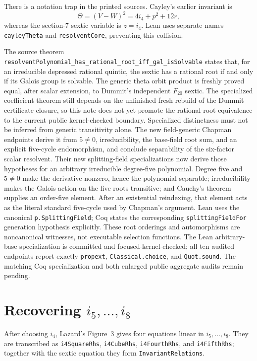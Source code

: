 \documentclass[11pt,a4paper,oneside]{article}
\newcommand{\lean}[1]{\nolinkurl{#1}}
\newcommand{\ii}[1]{i_{#1}}
\begin{document}
There is a notation trap in the printed sources.  Cayley's earlier invariant is
\[
 \Theta=(V-W)^2=4\ii4+p^2+12r,
\]
whereas the section-7 sextic variable is $z=\ii4$.  Lean uses separate names
\lean{cayleyTheta} and \lean{resolventCore}, preventing this collision.

The source theorem
\lean{resolventPolynomial_has_rational_root_iff_gal_isSolvable} states that,
for an irreducible depressed rational quintic, the sextic has a rational root
if and only if its Galois group is solvable.  The generic theta orbit product
is freshly proved equal, after scalar extension, to Dummit's independent
$F_{20}$ sextic.  The specialized coefficient theorem still depends on the
unfinished fresh rebuild of the Dummit certificate closure, so this note does
not yet promote the rational-root equivalence to the current public
kernel-checked boundary.  Specialized distinctness must not be inferred from generic
transitivity alone.  The new field-generic Chapman endpoints derive it from
$5\ne0$, irreducibility, the base-field root sum, and an explicit five-cycle
endomorphism, and conclude separability of the six-factor scalar resolvent.
Their new splitting-field specializations now derive those hypotheses for an
arbitrary irreducible degree-five polynomial.  Degree five and $5\ne0$ make
the derivative nonzero, hence the polynomial separable; irreducibility makes
the Galois action on the five roots transitive; and Cauchy's theorem supplies
an order-five element.  After an existential reindexing, that element acts as
the literal standard five-cycle used by Chapman's argument.  Lean uses the
canonical \texttt{p.SplittingField}; Coq states the corresponding
\texttt{splittingFieldFor} generation hypothesis explicitly.  These root
orderings and automorphisms are noncanonical witnesses, not executable
selection functions.  The Lean arbitrary-base specialization is committed
and focused-kernel-checked; all ten audited endpoints report exactly
\lean{propext}, \lean{Classical.choice}, and \lean{Quot.sound}.  The matching
Coq specialization and both enlarged public aggregate audits remain pending.

\section[Recovering i5 through i8]{Recovering $\ii5,\ldots,\ii8$}

After choosing $\ii4$, Lazard's Figure~3 gives four equations linear in
$\ii5,\ldots,\ii8$.  They are transcribed as
\lean{i4SquareRhs}, \lean{i4CubeRhs}, \lean{i4FourthRhs}, and
\lean{i4FifthRhs}; together with the sextic equation they form
\lean{InvariantRelations}.
\end{document}
